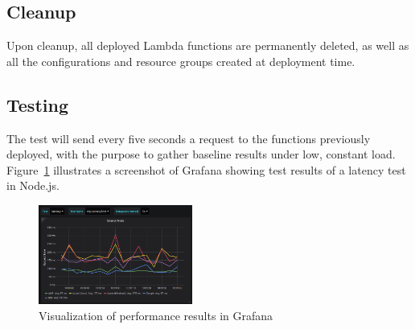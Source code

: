 \subsection{Cleanup}
Upon cleanup, all deployed Lambda functions are permanently deleted, as well as all the configurations and resource groups created at deployment time. %

\subsection{Testing}
The test will send every five seconds a request to the functions previously deployed, with the purpose to gather baseline results under low, constant load. %
Figure~\ref{fig:grafana} illustrates a screenshot of Grafana showing test results of a latency test in Node.js. 

\begin{figure}[!t]
\begin{center}
\includegraphics[width=0.45\textwidth]{bilder/grafana.png}
\captionsetup{justification=centering, labelfont=bf}
\caption{Visualization of performance results in Grafana}
\label{fig:grafana}
\end{center}
\end{figure}




